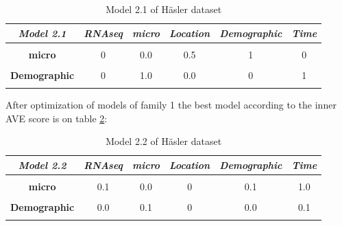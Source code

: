 \documentclass[
  12pt,
  a4paper,
  twoside,
  openright]{book}
\begin{document}
\begin{table}[H]

\caption[Model 2.1 of Häsler dataset]{\label{tab:hasler-model-2-1}Model 2.1 of Häsler dataset}
\centering
\begin{tabular}[t]{|>{}c|c|c|c|c|>{}c|}
\hline
\em{\textbf{Model 2.1}} & \em{\textbf{RNAseq}} & \em{\textbf{micro}} & \em{\textbf{Location}} & \em{\textbf{Demographic}} & \em{\textbf{Time}}\\
\hline
\textbf{\cellcolor{gray!6}{RNAseq}} & \cellcolor{gray!6}{0} & \cellcolor{gray!6}{0.0} & \cellcolor{gray!6}{1.0} & \cellcolor{gray!6}{0} & \cellcolor{gray!6}{0}\\
\hline
\textbf{micro} & 0 & 0.0 & 0.5 & 1 & 0\\
\hline
\textbf{\cellcolor{gray!6}{Location}} & \cellcolor{gray!6}{1} & \cellcolor{gray!6}{0.5} & \cellcolor{gray!6}{0.0} & \cellcolor{gray!6}{0} & \cellcolor{gray!6}{0}\\
\hline
\textbf{Demographic} & 0 & 1.0 & 0.0 & 0 & 1\\
\hline
\textbf{\cellcolor{gray!6}{Time}} & \cellcolor{gray!6}{0} & \cellcolor{gray!6}{0.0} & \cellcolor{gray!6}{0.0} & \cellcolor{gray!6}{1} & \cellcolor{gray!6}{0}\\
\hline
\end{tabular}
\end{table}

After optimization of models of family 1 the best model according to the inner AVE score is on table \ref{tab:hasler-model-2-2}:

\begin{table}[H]

\caption[Model 2.2 of Häsler dataset]{\label{tab:hasler-model-2-2}Model 2.2 of Häsler dataset}
\centering
\begin{tabular}[t]{|>{}c|c|c|c|c|>{}c|}
\hline
\em{\textbf{Model 2.2}} & \em{\textbf{RNAseq}} & \em{\textbf{micro}} & \em{\textbf{Location}} & \em{\textbf{Demographic}} & \em{\textbf{Time}}\\
\hline
\textbf{\cellcolor{gray!6}{RNAseq}} & \cellcolor{gray!6}{0.0} & \cellcolor{gray!6}{0.1} & \cellcolor{gray!6}{1} & \cellcolor{gray!6}{0.0} & \cellcolor{gray!6}{0.0}\\
\hline
\textbf{micro} & 0.1 & 0.0 & 0 & 0.1 & 1.0\\
\hline
\textbf{\cellcolor{gray!6}{Location}} & \cellcolor{gray!6}{1.0} & \cellcolor{gray!6}{0.0} & \cellcolor{gray!6}{0} & \cellcolor{gray!6}{0.0} & \cellcolor{gray!6}{0.0}\\
\hline
\textbf{Demographic} & 0.0 & 0.1 & 0 & 0.0 & 0.1\\
\hline
\textbf{\cellcolor{gray!6}{Time}} & \cellcolor{gray!6}{0.0} & \cellcolor{gray!6}{1.0} & \cellcolor{gray!6}{0} & \cellcolor{gray!6}{0.1} & \cellcolor{gray!6}{0.0}\\
\hline
\end{tabular}
\end{table}
\end{document}
